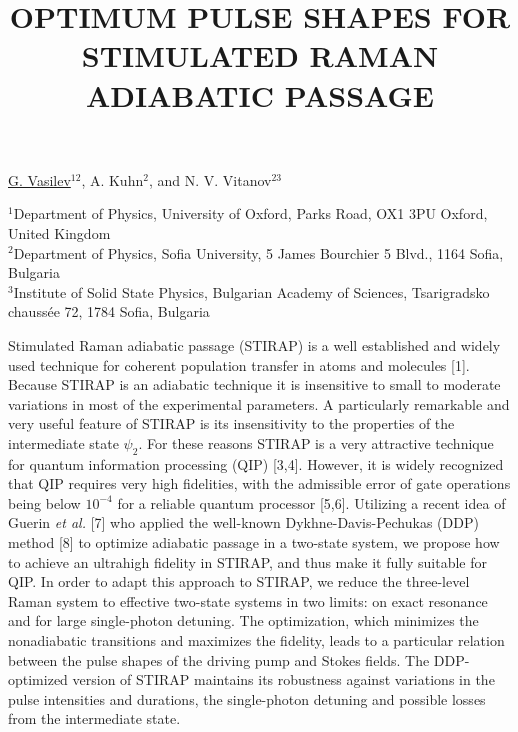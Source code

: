 \title{OPTIMUM PULSE SHAPES FOR STIMULATED RAMAN ADIABATIC PASSAGE}

\underline{G. Vasilev}$^{12}$, A. Kuhn$^2$, and N. V. Vitanov$^{23}$


$^1$Department of Physics, University of Oxford, Parks Road, OX1 3PU Oxford, United Kingdom\\
$^2$Department of Physics, Sofia University, 5 James Bourchier 5 Blvd., 1164 Sofia, Bulgaria\\
$^3$Institute of Solid State Physics, Bulgarian Academy of Sciences, Tsarigradsko chauss\'{e}e 72, 1784 Sofia, Bulgaria

Stimulated Raman adiabatic passage (STIRAP) is a well established
and widely used technique for coherent population transfer in
atoms and molecules [1]. Because STIRAP is an adiabatic
technique it is insensitive to small to moderate variations in
most of the experimental parameters. A particularly remarkable and
very useful feature of STIRAP is its insensitivity to the
properties of the intermediate state $\psi_2$. For these reasons
STIRAP is a very attractive technique for quantum information
processing (QIP) [3,4]. However, it is
widely recognized that QIP requires very high fidelities, with the
admissible error of gate operations being below $10^{-4}$ for a
reliable quantum processor [5,6].
Utilizing a recent idea of Guerin \emph{et al.} [7] who
applied the well-known Dykhne-Davis-Pechukas (DDP) method
[8] to optimize adiabatic passage in a two-state
system, we propose how to achieve an ultrahigh fidelity in STIRAP,
and thus make it fully suitable for QIP. In order to adapt this
approach to STIRAP, we reduce the three-level Raman system to
effective two-state systems in two limits: on exact resonance and
for large single-photon detuning. The optimization, which
minimizes the nonadiabatic transitions and maximizes the fidelity,
leads to a particular relation between the pulse shapes of the
driving pump and Stokes fields. The DDP-optimized version of
STIRAP maintains its robustness against variations in the pulse
intensities and durations, the single-photon detuning and possible
losses from the intermediate state.

